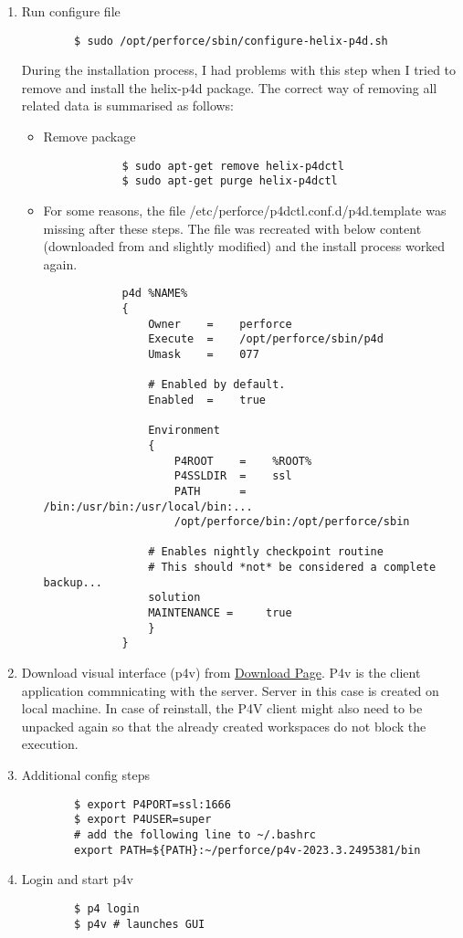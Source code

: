 \begin{enumerate}
\begin{verbatim}
    \end{verbatim}
    \item Run configure file
    \begin{verbatim}
        $ sudo /opt/perforce/sbin/configure-helix-p4d.sh
    \end{verbatim}
    During the installation process, I had problems with this step when I tried to remove and install the helix-p4d
    package. The correct way of removing all related data is summarised as follows:
    \begin{itemize}
        \item Remove package
        \begin{verbatim}
            $ sudo apt-get remove helix-p4dctl
            $ sudo apt-get purge helix-p4dctl
        \end{verbatim}
        \item For some reasons, the file \colorbox{blue!30}{/etc/perforce/p4dctl.conf.d/p4d.template} was missing after
        these steps. The file was recreated with below content (downloaded from \href{https://portal.perforce.com/s/article/15056}{\color{blue}{here}} 
        and slightly modified) and the install process worked again.
        \begin{verbatim}
            p4d %NAME%
            {
                Owner    =    perforce
                Execute  =    /opt/perforce/sbin/p4d
                Umask    =    077

                # Enabled by default.
                Enabled  =    true

                Environment
                {
                    P4ROOT    =    %ROOT%
                    P4SSLDIR  =    ssl
                    PATH      =    /bin:/usr/bin:/usr/local/bin:...
                    /opt/perforce/bin:/opt/perforce/sbin

                # Enables nightly checkpoint routine
                # This should *not* be considered a complete backup...
                solution
                MAINTENANCE =     true
                }
            }
        \end{verbatim}
    \end{itemize}
    \item Download visual interface (p4v) from 
    \href{https://www.perforce.com/downloads/helix-visual-client-p4v}{\color{blue} Download Page}.
    P4v is the client application commnicating with the server. Server in this case is created on local machine. In case of
    reinstall, the P4V client might also need to be unpacked again so that the already created workspaces do not block
    the execution.
    \item Additional config steps
    \begin{verbatim}
        $ export P4PORT=ssl:1666
        $ export P4USER=super
        # add the following line to ~/.bashrc
        export PATH=${PATH}:~/perforce/p4v-2023.3.2495381/bin
    \end{verbatim}
    \item Login and start p4v
    \begin{verbatim}
        $ p4 login
        $ p4v # launches GUI
    \end{verbatim}
\end{enumerate}

